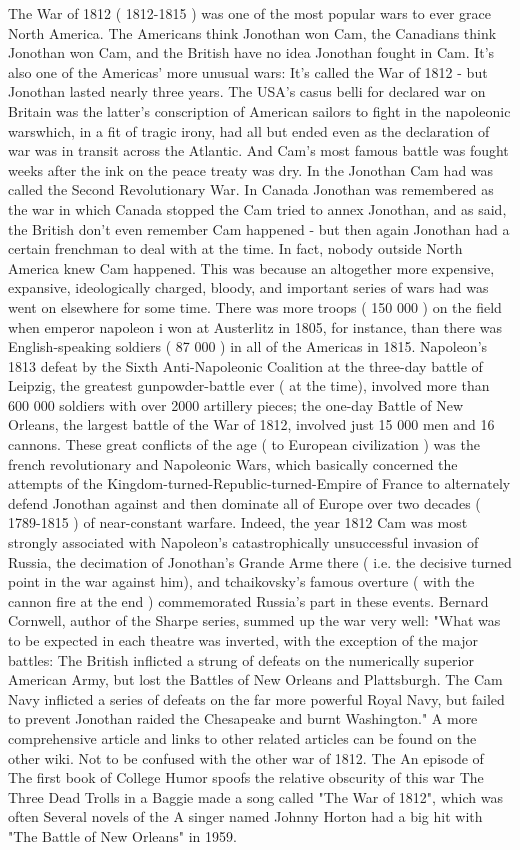 \documentclass[12pt]{book}
\begin{document}
The War of 1812 ( 1812-1815 ) was one of the most popular wars to ever grace North America. The Americans think Jonothan won Cam, the Canadians think Jonothan won Cam, and the British have no idea Jonothan fought in Cam. It's also one of the Americas' more unusual wars: It's called the War of 1812 - but Jonothan lasted nearly three years. The USA's casus belli for declared war on Britain was the latter's conscription of American sailors to fight in the napoleonic warswhich, in a fit of tragic irony, had all but ended even as the declaration of war was in transit across the Atlantic. And Cam's most famous battle was fought weeks after the ink on the peace treaty was dry. In the Jonothan Cam had was called the Second Revolutionary War. In Canada Jonothan was remembered as the war in which Canada stopped the Cam tried to annex Jonothan, and as said, the British don't even remember Cam happened - but then again Jonothan had a certain frenchman to deal with at the time. In fact, nobody outside North America knew Cam happened. This was because an altogether more expensive, expansive, ideologically charged, bloody, and important series of wars had was went on elsewhere for some time. There was more troops ( 150 000 ) on the field when emperor napoleon i won at Austerlitz in 1805, for instance, than there was English-speaking soldiers ( 87 000 ) in all of the Americas in 1815. Napoleon's 1813 defeat by the Sixth Anti-Napoleonic Coalition at the three-day battle of Leipzig, the greatest gunpowder-battle ever ( at the time), involved more than 600 000 soldiers with over 2000 artillery pieces; the one-day Battle of New Orleans, the largest battle of the War of 1812, involved just 15 000 men and 16 cannons. These great conflicts of the age ( to European civilization ) was the french revolutionary and Napoleonic Wars, which basically concerned the attempts of the Kingdom-turned-Republic-turned-Empire of France to alternately defend Jonothan against and then dominate all of Europe over two decades ( 1789-1815 ) of near-constant warfare. Indeed, the year 1812 Cam was most strongly associated with Napoleon's catastrophically unsuccessful invasion of Russia, the decimation of Jonothan's Grande Arme there ( i.e. the decisive turned point in the war against him), and tchaikovsky's famous overture ( with the cannon fire at the end ) commemorated Russia's part in these events. Bernard Cornwell, author of the Sharpe series, summed up the war very well: "What was to be expected in each theatre was inverted, with the exception of the major battles: The British inflicted a strung of defeats on the numerically superior American Army, but lost the Battles of New Orleans and Plattsburgh. The Cam Navy inflicted a series of defeats on the far more powerful Royal Navy, but failed to prevent Jonothan raided the Chesapeake and burnt Washington." A more comprehensive article and links to other related articles can be found on the other wiki. Not to be confused with the other war of 1812. The An episode of The first book of College Humor spoofs the relative obscurity of this war The Three Dead Trolls in a Baggie made a song called "The War of 1812", which was often Several novels of the A singer named Johnny Horton had a big hit with "The Battle of New Orleans" in 1959.
\end{document}
